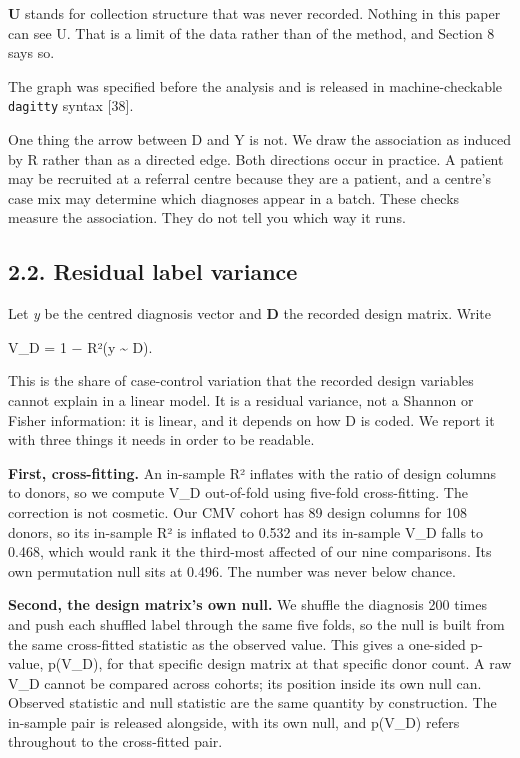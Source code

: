 \textbf{U} stands for collection structure that was never recorded. Nothing in this paper can see U. That is a limit of the data rather than of the method, and Section 8 says so.

The graph was specified before the analysis and is released in machine-checkable \texttt{dagitty} syntax {[}38{]}.

One thing the arrow between D and Y is not. We draw the association as induced by R rather than as a directed edge. Both directions occur in practice. A patient may be recruited at a referral centre because they are a patient, and a centre's case mix may determine which diagnoses appear in a batch. These checks measure the association. They do not tell you which way it runs.

\subsection{2.2. Residual label variance}\label{residual-label-variance}

Let \emph{y} be the centred diagnosis vector and \textbf{D} the recorded design matrix. Write

V\_D = 1 − R²(y \textasciitilde{} D).

This is the share of case-control variation that the recorded design variables cannot explain in a linear model. It is a residual variance, not a Shannon or Fisher information: it is linear, and it depends on how D is coded. We report it with three things it needs in order to be readable.

\textbf{First, cross-fitting.} An in-sample R² inflates with the ratio of design columns to donors, so we compute V\_D out-of-fold using five-fold cross-fitting. The correction is not cosmetic. Our CMV cohort has 89 design columns for 108 donors, so its in-sample R² is inflated to 0.532 and its in-sample V\_D falls to 0.468, which would rank it the third-most affected of our nine comparisons. Its own permutation null sits at 0.496. The number was never below chance.

\textbf{Second, the design matrix's own null.} We shuffle the diagnosis 200 times and push each shuffled label through the same five folds, so the null is built from the same cross-fitted statistic as the observed value. This gives a one-sided p-value, p(V\_D), for that specific design matrix at that specific donor count. A raw V\_D cannot be compared across cohorts; its position inside its own null can. Observed statistic and null statistic are the same quantity by construction. The in-sample pair is released alongside, with its own null, and p(V\_D) refers throughout to the cross-fitted pair.

